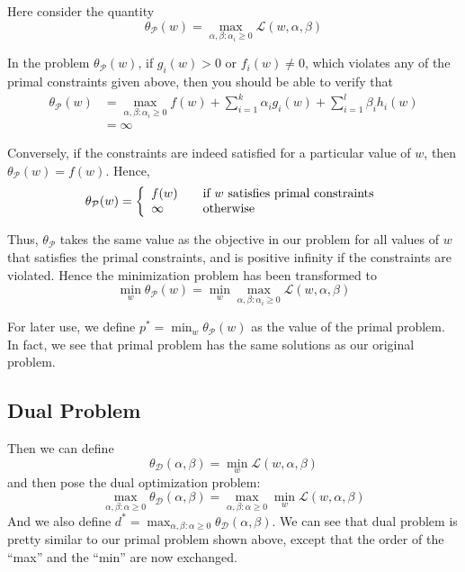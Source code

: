 \documentclass[a4paper]{article}
\begin{document}
Here consider the quantity
$$
	\theta_{\mathcal{P}}(w) = \max_{\alpha, \beta : \alpha_i \geq 0} \mathcal{L}(w, \alpha, \beta)
$$

In the problem $\theta_{\mathcal{P}}(w)$, if $g_i(w) > 0$ or $f_i(w) \ne 0$, which violates any of the primal constraints given above, then you should be able to verify that 
\begin{align*}
	\theta_{\mathcal{P}}(w) &= \max_{\alpha, \beta : \alpha_i \geq 0} f(w) + \sum_{i=1}^{k} \alpha_i g_i(w) + \sum_{i=1}^{l} \beta_i h_i(w) \\
	&= \infty
\end{align*}

Conversely, if the constraints are indeed satisfied for a particular value of $w$, then $\theta_{\mathcal{P}}(w) = f(w)$. Hence,
	\[ \theta_{\mathcal{P}}(w) = \left\{ 
  		\begin{array}{l l}
    			f(w) & \quad \text{if $w$ satisfies primal constraints}\\
 			\infty & \quad \text{otherwise}
 		 \end{array} \right.\]

Thus, $\theta_{\mathcal{P}}$ takes the same value as the objective in our problem for all values of $w$ that satisfies the primal constraints, and is positive infinity if the constraints are violated. Hence the minimization problem has been transformed to
$$
	\min_{w} \theta_{\mathcal{P}}(w) = \min_{w}  \max_{\alpha, \beta : \alpha_i \geq 0} \mathcal{L}(w, \alpha, \beta)
$$

For later use, we define $p^\ast = \min_w \theta_{\mathcal{P}}(w)$ as the value of the primal problem. In fact, we see that primal problem has the same solutions as our original problem. 

\subsection{Dual Problem}
Then we can define
$$
	\theta_{\mathcal{D}} (\alpha, \beta) = \min_{w} \mathcal{L} (w, \alpha, \beta)
$$
and then pose the dual optimization problem:
$$
	\max_{\alpha, \beta : \alpha \geq 0} \theta_{\mathcal{D}}(\alpha, \beta) = \max_{\alpha, \beta : \alpha \geq 0} \min_{w} \mathcal{L} (w, \alpha, \beta)
$$
And we also define $d^\ast=\max_{\alpha, \beta : \alpha \geq 0} \theta_{\mathcal{D}}(\alpha, \beta) $. We can see that dual problem is pretty similar to our primal problem shown above, except that the order of the ``max'' and the ``min'' are now exchanged.
\end{document}

